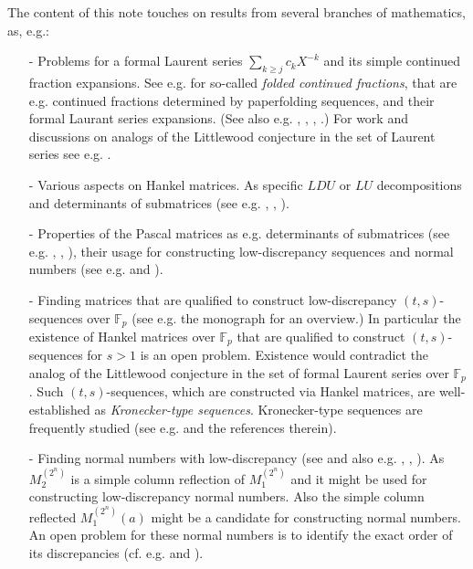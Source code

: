 \documentclass{article}
\newcommand{\FF}{\mathbb F}
\begin{document}
The content of this note touches on results from several branches of mathematics, as, e.g.:
\begin{itemize}

	\item[-] Problems for a formal Laurent series $\sum_{k\geq j}c_kX^{-k}$ and its simple continued fraction expansions. See e.g. \cite{Alletal} for so-called \emph{folded continued fractions}, that are e.g. continued fractions determined by paperfolding sequences, and their formal Laurant series expansions. (See also e.g.  \cite{bacher}, \cite{hofJNT}, \cite{Poo}, \cite{PoSh}.) For work and discussions on analogs of the Littlewood conjecture in the set of Laurent series see e.g. \cite{ANL}.   
	\item[-] Various aspects on Hankel matrices. As specific $LDU$ or $LU$ decompositions and determinants of submatrices (see e.g. \cite{bacher}, \cite{hofJNT}, \cite{PeartWoan}). 
	\item[-] Properties of the Pascal matrices as e.g. determinants of submatrices (see e.g. \cite{BaCh}, \cite{Lunnon}, \cite{mereb}), their usage for constructing low-discrepancy sequences and normal numbers (see e.g. \cite{faure} and \cite{levin99}).
	\item[-] Finding matrices that are qualified to construct low-discrepancy $(t,s)$-sequences over $\FF_p$ (see e.g. the monograph \cite{DP} for an overview.)	In particular the existence of Hankel matrices over $\FF_p$ that are qualified to construct $(t,s)$-sequences for $s>1$ is an open problem. Existence would contradict the analog of the Littlewood conjecture in the set of formal Laurent series over $\FF_p$. Such $(t,s)$-sequences, which are constructed via Hankel matrices, are well-established as \emph{Kronecker-type sequences}. Kronecker-type sequences are frequently studied (see e.g. \cite{hofFFA} and the references therein). %
	\item[-] Finding normal numbers with low-discrepancy (see \cite{levin99} and also e.g. \cite{BechCart}, \cite{hoflarNN1}, \cite{hoflarNN2}). As $M_2^{(2^n)}$ is a simple column reflection of $M_1^{(2^n)}$ and it might be used for constructing low-discrepancy normal numbers. Also the simple column reflected $M^{(2^n)}_1(a)$ might be a candidate for constructing normal numbers. An open problem for these normal numbers is to identify the exact order of its discrepancies (cf. e.g. \cite{hoflarNN1} and \cite{hoflarNN2}).

\end{itemize}
\end{document}
